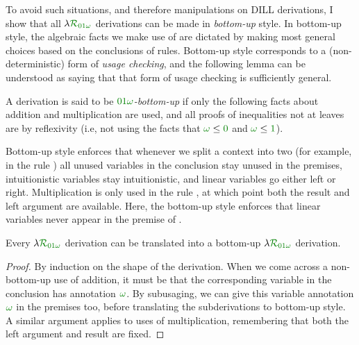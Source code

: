 To avoid such situations, and therefore manipulations on DILL derivations, I
show that all $\name_{\instDILL}$ derivations can be made in \emph{bottom-up}
style.
In bottom-up style, the algebraic facts we make use of are dictated by making
most general choices based on the conclusions of rules.
Bottom-up style corresponds to a (non-deterministic) form of
\emph{usage checking}, and the following lemma can be understood as saying
that that form of usage checking is sufficiently general.

\begin{definition}
  A derivation is said to be \emph{$\instDILL$-bottom-up} if only the following
  facts about addition and multiplication are used, and all proofs of
  inequalities not at leaves are by reflexivity (i.e, not using the facts that
  $\gr\omega \leq \gr0$ and $\gr\omega \leq \gr1$).

\end{definition}

Bottom-up style enforces that whenever we split a context into two (for
example, in the rule ) all unused variables in the
conclusion stay unused in the premises, intuitionistic variables stay
intuitionistic, and linear variables go either left or right.
Multiplication is only used in the rule , at which point
both the result and left argument are available.
Here, the bottom-up style enforces that linear variables never appear in the
premise of .

\begin{lemma}
  Every $\name_{\instDILL}$ derivation can be translated into a bottom-up
  $\name_{\instDILL}$ derivation.
\end{lemma}
\begin{proof}
  By induction on the shape of the derivation.
  When we come across a non-bottom-up use of addition, it must be that the
  corresponding variable in the conclusion has annotation $\gr\omega$.
  By subusaging, we can give this variable annotation $\gr\omega$ in
  the premises too, before translating the subderivations to bottom-up
  style.
  A similar argument applies to uses of multiplication, remembering that both
  the left argument and result are fixed.
\end{proof}

